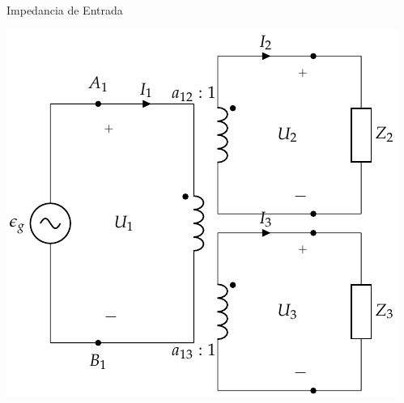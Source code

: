 \documentclass[aspectratio=169, usenames,svgnames,dvipsnames]{beamer}
\begin{document}
\begin{frame}[label={sec:orgba17304}]{Impedancia de Entrada}
\begin{center}
\includegraphics[height=0.9\textheight]{../figs/TrafoIdealVariosDevanados_Impedancia.pdf}
\end{center}
\end{frame}
\end{document}
